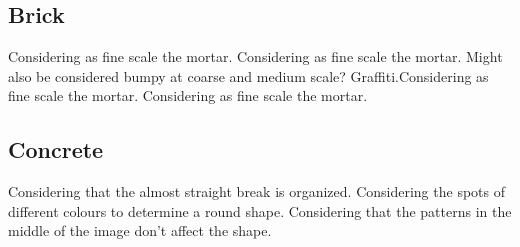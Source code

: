 \clearpage
\renewcommand{\mat}{Brick}
\subsection{\mat}

\renewcommand{\Number}{01}\InputImage{\sfl}{\tco}{\sexor}{\tco}{\sexor}{\tco}
{}{}
\renewcommand{\Number}{02}\InputImage{\sfl}{\tsc}{\sexor}{\tco}{\sexor}{\tco}
{}{Considering as fine scale the mortar.}
\renewcommand{\Number}{03}\InputImage{\sfl}{\tsc}{\sfl}{\tco}{\sexor}{\tsc}
{}{Considering as fine scale the mortar.}
\renewcommand{\Number}{04}\InputImage{\sfl}{\tco}{\sexor}{\tco}{\sexor}{\tco}
{}{}
\renewcommand{\Number}{05}\InputImage{\sfl}{\tco}{\sexor}{\tco}{\sexor}{\tco}
{}{Might also be considered bumpy at coarse and medium scale?}
\renewcommand{\Number}{06}\InputImage{\sfl}{\tco}{\sexor}{\tsm}{\sexor}{\tsm}
{Graffiti.}{Considering as fine scale the mortar.}
\renewcommand{\Number}{07}\InputImage{\sfl}{\tco}{\sexor}{\tco}{\sexor}{\tco}
{}{}
\renewcommand{\Number}{08}\InputImage{\sfl}{\tco}{\sexor}{\tbu}{\sexor}{\tbu}
{}{}
\renewcommand{\Number}{09}\InputImage{\sfl}{\tco}{\sexor}{\tco}{\sexor}{\tco}
{}{}
\renewcommand{\Number}{10}\InputImage{\sfl}{\tsc}{\sexor}{\tco}{\sexor}{\tco}
{}{Considering as fine scale the mortar.}
\renewcommand{\Number}{11}\InputImage{\sexor}{\tco}{\sexor}{\tco}{\sexor}{\tco}
{}{}
\renewcommand{\Number}{12}\InputImage{\sfl}{\tsm}{\sexor}{\tsm}{\sexor}{\tbu}
{}{}

\clearpage
\renewcommand{\mat}{Concrete}
\subsection{\mat}

\renewcommand{\Number}{01}\InputImage{\sfl}{\tco}{\sfl}{\tco}{\sfl}{\tco}
{}{}
\renewcommand{\Number}{02}\InputImage{\sfl}{\tco}{\sfl}{\tco}{\sexdi}{\tco}
{}{}
\renewcommand{\Number}{03}\InputImage{\sfl}{\tco}{\sfl}{\tco}{\sexdi}{\tbu}
{}{}
\renewcommand{\Number}{04}\InputImage{\sfl}{\tsc}{\sfl}{\tsc}{\sfl}{\tsc}
{}{}
\renewcommand{\Number}{05}\InputImage{\sfl}{\tco}{\sfl}{\tco}{\sexor}{\tco}
{}{}
\renewcommand{\Number}{06}\InputImage{\sfl}{\tco}{\sfl}{\tco}{\sexor}{\tco}
{}{Considering that the almost straight break is organized.}
\renewcommand{\Number}{07}\InputImage{\sfl}{\tco}{\sfl}{\tco}{\sro}{\tsc}
{}{Considering the spots of different colours to determine a round shape.}
\renewcommand{\Number}{08}\InputImage{\sfl}{\tco}{\sfl}{\tco}{\sfl}{\tco}
{}{Considering that the patterns in the middle of the image don't affect the shape.}
\renewcommand{\Number}{09}\InputImage{\sfl}{\tco}{\sfl}{\tco}{\sfl}{\tco}
{}{}
\renewcommand{\Number}{10}\InputImage{\sfl}{\tco}{\sfl}{\tco}{\sexdi}{\tco}
{}{}
\renewcommand{\Number}{11}\InputImage{\sfl}{\tco}{\sfl}{\tsc}{\sfl}{\tsc}
{}{}
\renewcommand{\Number}{12}\InputImage{\sfl}{\tsc}{\sfl}{\tsc}{\sfl}{\tsc}
{}{}

